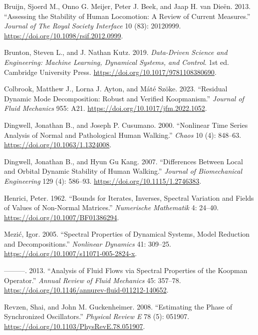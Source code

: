 \documentclass[
  letterpaper,
  DIV=11,
  numbers=noendperiod]{scrartcl}
\newlength{\cslhangindent}
\newenvironment{CSLReferences}[2] %
 {\begin{list}{}{%
  \setlength{\itemindent}{0pt}
  \setlength{\leftmargin}{0pt}
  \setlength{\parsep}{0pt}
  \ifodd #1
   \setlength{\leftmargin}{\cslhangindent}
   \setlength{\itemindent}{-1\cslhangindent}
  \fi
  \setlength{\itemsep}{#2\baselineskip}}}
 {\end{list}}
\begin{document}
\protect{}\label{refs}
\begin{CSLReferences}{1}{0}
Bruijn, Sjoerd M., Onno G. Meijer, Peter J. Beek, and Jaap H. van Dieën.
2013. {``Assessing the Stability of Human Locomotion: A Review of
Current Measures.''} \emph{Journal of The Royal Society Interface} 10
(83): 20120999. \url{https://doi.org/10.1098/rsif.2012.0999}.

Brunton, Steven L., and J. Nathan Kutz. 2019. \emph{Data-Driven Science
and Engineering: Machine Learning, Dynamical Systems, and Control}. 1st
ed. Cambridge University Press.
\url{https://doi.org/10.1017/9781108380690}.

Colbrook, Matthew J., Lorna J. Ayton, and Máté Szöke. 2023. {``Residual
{Dynamic} {Mode} {Decomposition}: Robust and Verified {Koopmanism}.''}
\emph{Journal of Fluid Mechanics} 955: A21.
\url{https://doi.org/10.1017/jfm.2022.1052}.

Dingwell, Jonathan B., and Joseph P. Cusumano. 2000. {``Nonlinear Time
Series Analysis of Normal and Pathological Human Walking.''}
\emph{Chaos} 10 (4): 848--63. \url{https://doi.org/10.1063/1.1324008}.

Dingwell, Jonathan B., and Hyun Gu Kang. 2007. {``Differences Between
Local and Orbital Dynamic Stability of Human Walking.''} \emph{Journal
of Biomechanical Engineering} 129 (4): 586--93.
\url{https://doi.org/10.1115/1.2746383}.

Henrici, Peter. 1962. {``Bounds for Iterates, Inverses, Spectral
Variation and Fields of Values of Non-Normal Matrices.''}
\emph{Numerische Mathematik} 4: 24--40.
\url{https://doi.org/10.1007/BF01386294}.

Mezić, Igor. 2005. {``Spectral Properties of Dynamical Systems, Model
Reduction and Decompositions.''} \emph{Nonlinear Dynamics} 41: 309--25.
\url{https://doi.org/10.1007/s11071-005-2824-x}.

---------. 2013. {``Analysis of Fluid Flows via Spectral Properties of
the {Koopman} Operator.''} \emph{Annual Review of Fluid Mechanics} 45:
357--78. \url{https://doi.org/10.1146/annurev-fluid-011212-140652}.

Revzen, Shai, and John M. Guckenheimer. 2008. {``Estimating the Phase of
Synchronized Oscillators.''} \emph{Physical Review E} 78 (5): 051907.
\url{https://doi.org/10.1103/PhysRevE.78.051907}.


\end{CSLReferences}
\end{document}
